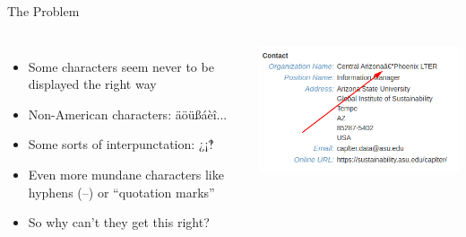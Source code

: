 \begin{frame}{The Problem}
%
\begin{columns}[t]
\begin{itemize}
\item Some characters seem never to be displayed the right way
\item Non-American characters: äöüßáèî...
\item Some sorts of interpunctation: ¿¡‽
\item Even more mundane characters like hyphens (--) or \enquote{quotation marks}
\item[\Thus] So why can't they get this right?
\end{itemize}
%
\begin{center}
\includegraphics[width=\linewidth]{./gfx/unicode-fail} 
\end{center}
\end{columns}
%
\end{frame}


